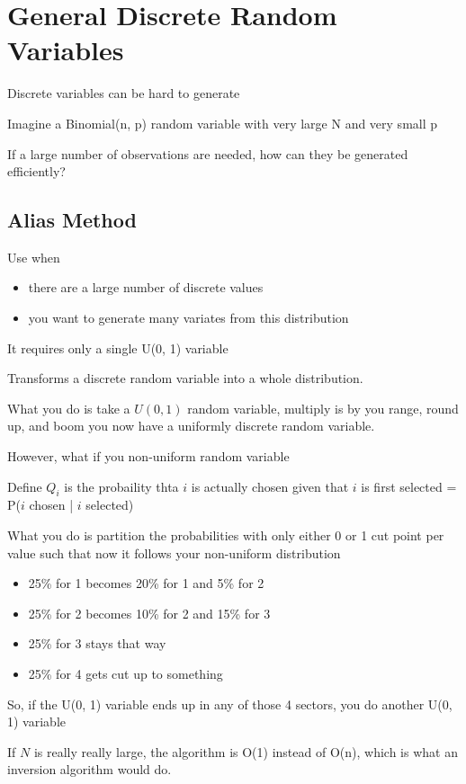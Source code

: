 \documentclass[fleqn]{report}
\begin{document}
\section{General Discrete Random Variables}
Discrete variables can be hard to generate 

Imagine a Binomial(n, p) random variable with very large N and very small p 

If a large number of observations are needed, how can they be generated 
efficiently?

\subsection{Alias Method}
Use when 
\begin{itemize}
    \item
    there are a large number of discrete values 
    \item 
    you want to generate many variates from this distribution 
\end{itemize} 

It requires only a single U(0, 1) variable 

Transforms a discrete random variable into a whole distribution. 

What you do is take a $U(0, 1)$ random variable, multiply is by 
you range, round up, and boom you now have a uniformly discrete random variable. 

However, what if you non-uniform random variable 

Define $Q_i$ is the probaility thta $i$ is actually chosen given that $i$ is 
first selected 
=
P($i$ chosen | $i$ selected)

What you do is partition the probabilities with only either 0 or 1 cut point 
per value such that now it follows your non-uniform distribution 

\begin{itemize}
    \item 
    25\% for 1 becomes 20\% for 1 and 5\% for 2 
    \item 
    25\% for 2 becomes 10\% for 2 and 15\% for 3
    \item 
    25\% for 3 stays that way 
    \item 
    25\% for 4 gets cut up to something 
\end{itemize}

So, if the U(0, 1) variable ends up in any of those 4 sectors, you do 
another U(0, 1) variable 

If $N$ is really really large, the algorithm is O(1) instead of O(n), which 
is what an inversion algorithm would do. 
\end{document}
